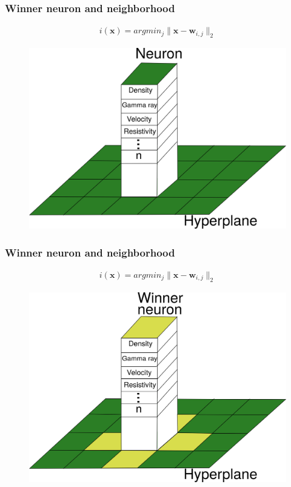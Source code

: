 \documentclass[aspectratio=10]{beamer} %
\begin{document}
\begin{frame}
	\frametitle{Winner neuron and neighborhood}	
	\begin{eqnarray}
	i(\textbf{x})= argmin_{j}  \parallel \textbf{x} - \textbf{w}_{i,j} \parallel_{2} \nonumber
	\end{eqnarray}
	\begin{figure}
		\centering
		\includegraphics[scale=0.33]{Imagens/hiperplano.png}
		\label{vencedor1}
	\end{figure}
\end{frame}

\begin{frame}
	\frametitle{Winner neuron and neighborhood}
	\begin{eqnarray}
	i(\textbf{x})= argmin_{j}  \parallel \textbf{x} - \textbf{w}_{i,j} \parallel_{2} \nonumber
	\end{eqnarray}
	\begin{figure}
		\centering
		\includegraphics[scale=0.33]{Imagens/winner.png}
		\label{vencedor2}
	\end{figure}
\end{frame}
\end{document}
